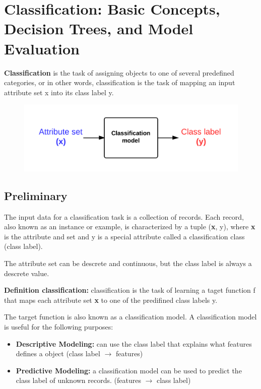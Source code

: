 \chapter{Classification: Basic Concepts, Decision Trees, and Model Evaluation}

	{\bf Classification} is the task of assigning objects to one of several
	predefined categories, or in other words, classification is the task
	of mapping an input attribute set x into its class label y.

	\begin{figure}[H]
		\centering
		\includegraphics[width=\textwidth]{pics/classification2.png}
	\end{figure}

	\clearpage

	\section{Preliminary}

		The input data for a classification task is a collection of records.
		Each record, also known as an instance or example, is characterized
		by a tuple ({\bf x}, y), where {\bf x} is the attribute and set and
		y is a special attribute called a classification class (class label).

		The attribute set can be descrete and continuous, but the class label
		is always a descrete value. 

		{\bf Definition classification:} classification is the task of
		learning a taget function f that maps each attribute set {\bf x}
		to one of the predifined class labels y.

		The target function is also known as a classification model.
		A classification model is useful for the following purposes:
			\begin{itemize}
				\item {\bf Descriptive Modeling:} can use the class label that
				explains what features defines a object (class label $\rightarrow$ features)				
				\item {\bf Predictive Modeling:} a classification model can be
				used to predict the class label of unknown records. (features $\rightarrow$ class label)
			\end{itemize}

